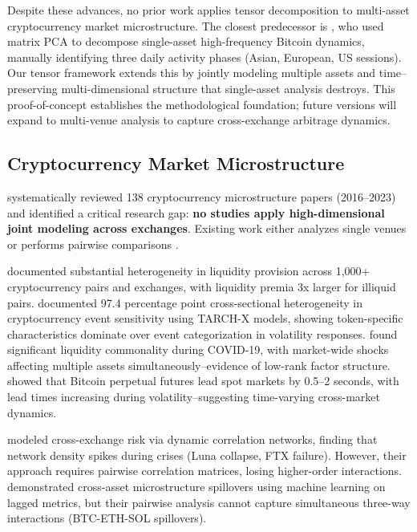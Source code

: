 \documentclass{article}
\begin{document}
Despite these advances, no prior work applies tensor decomposition to multi-asset cryptocurrency market microstructure. The closest predecessor is \citet{Watorek2023Decomposing}, who used matrix PCA to decompose single-asset high-frequency Bitcoin dynamics, manually identifying three daily activity phases (Asian, European, US sessions). Our tensor framework extends this by jointly modeling multiple assets and time--preserving multi-dimensional structure that single-asset analysis destroys. This proof-of-concept establishes the methodological foundation; future versions will expand to multi-venue analysis to capture cross-exchange arbitrage dynamics.

\subsection{Cryptocurrency Market Microstructure}

\citet{Almeida2024Cryptocurrency} systematically reviewed 138 cryptocurrency microstructure papers (2016--2023) and identified a critical research gap: \textbf{no studies apply high-dimensional joint modeling across exchanges}. Existing work either analyzes single venues \citep{Bozzetto2023Microstructure} or performs pairwise comparisons \citep{Wang2024CrossExchange}.

\citet{Bianchi2022Trading} documented substantial heterogeneity in liquidity provision across 1,000+ cryptocurrency pairs and exchanges, with liquidity premia 3x larger for illiquid pairs. \citet{Farzulla2025Cryptocurrency} documented 97.4 percentage point cross-sectional heterogeneity in cryptocurrency event sensitivity using TARCH-X models, showing token-specific characteristics dominate over event categorization in volatility responses. \citet{Liu2025LiquidityCommonality} found significant liquidity commonality during COVID-19, with market-wide shocks affecting multiple assets simultaneously--evidence of low-rank factor structure. \citet{DeFreitas2025HighFreq} showed that Bitcoin perpetual futures lead spot markets by 0.5--2 seconds, with lead times increasing during volatility--suggesting time-varying cross-market dynamics.

\citet{Wang2024CrossExchange} modeled cross-exchange risk via dynamic correlation networks, finding that network density spikes during crises (Luna collapse, FTX failure). However, their approach requires pairwise correlation matrices, losing higher-order interactions. \citet{Easley2024CrossAsset} demonstrated cross-asset microstructure spillovers using machine learning on lagged metrics, but their pairwise analysis cannot capture simultaneous three-way interactions (BTC-ETH-SOL spillovers).
\end{document}
